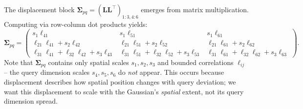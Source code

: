 \documentclass{article}
\theoremstyle{plain}
\theoremstyle{definition}
\theoremstyle{remark}
\begin{document}

The displacement block $\boldsymbol{\Sigma}_{pq} = (\mathbf{L}\mathbf{L}^\top)_{1:3,4:6}$ emerges from matrix multiplication. Computing via row-column dot products yields:
\begin{equation}
\boldsymbol{\Sigma}_{pq} = \left(\begin{array}{rrr}
                           s_1 \ell_{41} &                            s_1 \ell_{51} &                            s_1 \ell_{61} \\
     \ell_{21}\ell_{41} + s_2 \ell_{42} &      \ell_{21}\ell_{51} + s_2 \ell_{52} &      \ell_{21}\ell_{61} + s_2 \ell_{62} \\
\ell_{31}\ell_{41} + \ell_{32}\ell_{42} + s_3 \ell_{43} & \ell_{31}\ell_{51} + \ell_{32}\ell_{52} + s_3 \ell_{53} & \ell_{31}\ell_{61} + \ell_{32}\ell_{62} + s_3 \ell_{63}
\end{array}\right).
\end{equation}
Note that $\boldsymbol{\Sigma}_{pq}$ contains only spatial scales $s_1, s_2, s_3$ and bounded correlations $\ell_{ij}$ -- the query dimension scales $s_4, s_5, s_6$ do \textit{not} appear. This occurs because displacement describes how spatial position changes with query deviation; we want this displacement to scale with the Gaussian's \textit{spatial} extent, not its query dimension spread.
\end{document}
